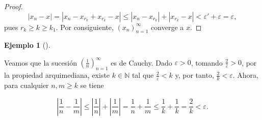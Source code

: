 \documentclass[
  a4paper,
]{scrreport}
\theoremstyle{definition}
\newtheorem{example}{Ejemplo}[chapter]
\theoremstyle{plain}
\theoremstyle{definition}
\theoremstyle{plain}
\theoremstyle{plain}
\theoremstyle{remark}
\begin{document}
\begin{tcolorbox}
\begin{proof}
\[
|x_n-x| = |x_n-x_{r_k}+x_{r_k}-x|\leq |x_n-x_{r_k}|+|x_{r_k}-x| < \varepsilon'+\varepsilon=\varepsilon,
\] pues \(r_k\geq k\geq k_1\). Por consiguiente, \((x_n)_{n=1}^\infty\)
converge a \(x\).

\end{proof}

\end{tcolorbox}

\leavevmode{}%
\begin{example}[]\label{exm-sucesion-cauchy}

Veamos que la sucesión \(\left(\frac{1}{n}\right)_{n=1}^\infty\) es de
Cauchy. Dado \(\varepsilon>0\), tomando \(\frac{2}{\varepsilon}>0\), por
la propiedad arquimediana, existe \(k\in\mathbb{N}\) tal que
\(\frac{2}{\varepsilon}<k\) y, por tanto, \(\frac{2}{k}<\varepsilon\).
Ahora, para cualquier \(n,m\geq k\) se tiene

\[
\left|\frac{1}{n}-\frac{1}{m}\right| \leq  \left|\frac{1}{n}\right| +\left|\frac{1}{m}\right| =\frac{1}{n}+\frac{1}{m} \leq \frac{1}{k}+\frac{1}{k}=\frac{2}{k}<\varepsilon.
\]

\end{example}
\end{document}
